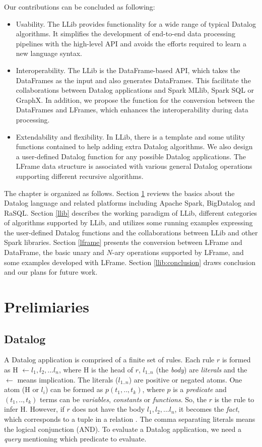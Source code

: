 Our contributions can be concluded as following:
\begin{itemize}
	\item Usability. The LLib  provides functionality for a wide range of typical Datalog algorithms. It simplifies the development of end-to-end data processing pipelines with the high-level API and avoids the efforts required to learn a new language syntax.
	\item Interoperability. The LLib is the DataFrame-based API, which takes the DataFrames as the input and also generates DataFrames. This facilitate the collaborations between Datalog applications and Spark MLlib, Spark SQL or GraphX. In addition, we propose the function for the conversion between the  DataFrames and LFrames, which enhances the interoperability during data processing.
	\item Extendability and flexibility. In LLib, there is a template and some utility functions contained to help  adding extra Datalog algorithms. We also design a user-defined Datalog function for any possible Datalog applications. The LFrame data structure is associated with various general Datalog operations supporting different recursive algorithms.
\end{itemize}
The chapter is organized as follows. Section \ref{pre} reviews the basics about the Datalog language and related platforms including Apache Spark, BigDatalog and RaSQL. Section \ref{llib} describes the working paradigm of LLib,  different categories of algorithms supported by LLib, and utilizes some running examples expressing the user-defined Datalog functions and the collaborations between LLib and other Spark libraries. 
Section \ref{lframe} presents the conversion between LFrame and DataFrame, the basic unary and $N$-ary operations supported by LFrame, and some examples developed with LFrame. Section \ref{llib:conclusion} draws  conclusion and our plans for future work.


\section{Prelimiaries}


\label{pre}
\subsection{Datalog}
A Datalog application is comprised of a finite set of rules. Each rule $r$ is formed as H $\leftarrow l_1, l_2, ... l_n$, where H is the head of $r$, $l_{1..n}$ (the \textit{body}) are \textit{literals}   and the $\leftarrow$ means implication. The literals ($l_{1..n}$) are positive or negated atoms. One atom (H or $l_i$) can be formed as $p(t_1, .., t_k)$, where $p$ is a \textit{predicate} and $(t_1, .., t_k)$ terms can be \textit{variables}, \textit{constants} or \textit{functions}. So, the $r$ is the rule to infer H. However, if $r$ does not have the body $l_1, l_2, ... l_n$, it becomes the \textit{fact}, which corresponds to a tuple in a relation . The comma separating literals means the logical conjunction (AND). To evaluate a Datalog application, we need a \textit{query} mentioning which predicate to evaluate.

